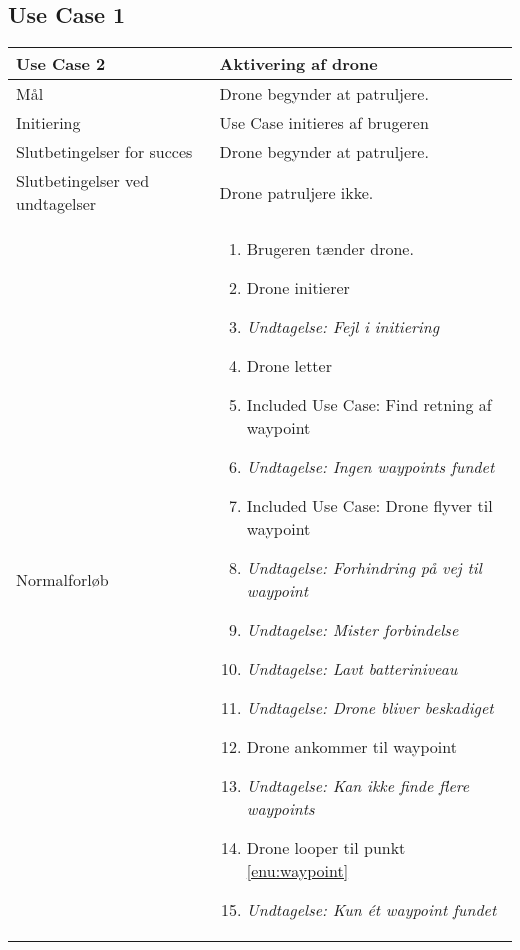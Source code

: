 \documentclass[Main]{subfiles}
\begin{document}
\subsection{Use Case 1}

\begin{longtable}{|p{}|p{}|}
\hline
Use Case 2 	& Aktivering af drone \\ \hline

Mål 		& Drone begynder at patruljere. \\ \hline

Initiering	& Use Case initieres af brugeren \\ \hline

Slutbetingelser for succes & 
Drone begynder at patruljere.  \\ \hline

Slutbetingelser ved undtagelser & 
Drone patruljere ikke. \\ \hline

Normalforløb &	\vspace{-8mm}
	\begin{enumerate}[noitemsep,nolistsep,leftmargin=*]
	\item Brugeren tænder drone.
	\item Drone initierer
	\item[] \textit{Undtagelse: Fejl i initiering}
	\item Drone letter
	\item \label{enu:waypoint} Included Use Case: Find retning af waypoint
	\item[] \textit{Undtagelse: Ingen waypoints fundet}
	\item \label{enu:flyvning} Included Use Case: Drone flyver til waypoint
	\item[] \textit{Undtagelse: Forhindring på vej til waypoint}
	\item[] \textit{Undtagelse: Mister forbindelse}
	\item[] \textit{Undtagelse: Lavt batteriniveau}
	\item[] \textit{Undtagelse: Drone bliver beskadiget}
	\item Drone ankommer til waypoint
	\item[] \textit{Undtagelse: Kan ikke finde flere waypoints}
	\item Drone looper til punkt \ref{enu:waypoint}
	\item[] \textit{Undtagelse: Kun ét waypoint fundet}
	\end{enumerate} \\ \hline


\end{longtable}
\end{document}
